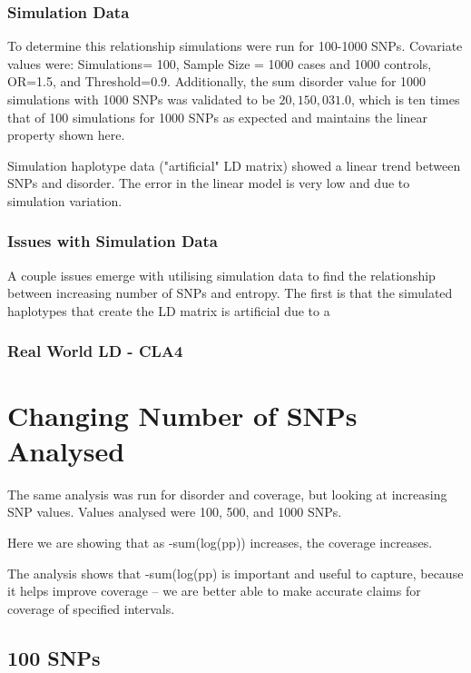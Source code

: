 \subsubsection{Simulation Data}
To determine this relationship simulations were run for 100-1000 SNPs. Covariate values were: Simulations= 100, Sample Size = 1000 cases and 1000 controls, OR=1.5, and  Threshold=0.9. Additionally, the sum disorder value for 1000 simulations with 1000 SNPs was validated to be $20,150,031.0$, which is ten times that of 100 simulations for 1000 SNPs as expected and maintains the linear property shown here. 

Simulation haplotype data ("artificial" LD matrix) showed a linear trend between SNPs and disorder. The error in the linear model is very low and due to simulation variation. 

\subsubsection{Issues with Simulation Data}
A couple issues emerge with utilising simulation data to find the relationship between increasing number of SNPs and entropy. The first is that the simulated haplotypes that create the LD matrix is artificial due to a 


\subsubsection{Real World LD - CLA4}
 
\section{Changing Number of SNPs Analysed} 
The same analysis was run for disorder and coverage, but looking at increasing SNP values. 
Values analysed were 100, 500, and 1000 SNPs.

Here we are showing that as -sum(log(pp))  increases, the coverage increases. 

The analysis shows that -sum(log(pp) is important and useful to capture, because it helps improve coverage – we are better able to make accurate claims for coverage of specified intervals. 

\subsection{100 SNPs}


